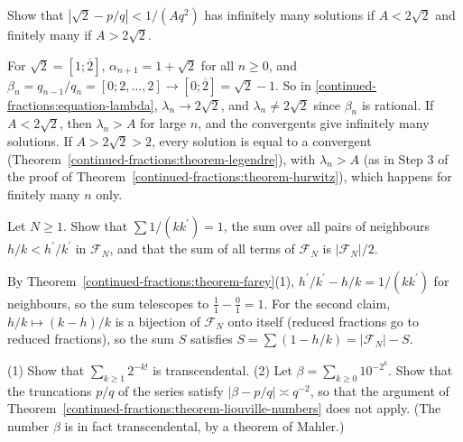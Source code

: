 \begin{exercise}\label{continued-fractions:exercise-sqrt-two-constant}
Show that $|\sqrt2 - p/q| < 1/(Aq^2)$ has infinitely many solutions if $A < 2\sqrt2$ and finitely many if $A > 2\sqrt2$.
\end{exercise}

\begin{solution}
For $\sqrt2 = [1; \overline{2}]$, $\alpha_{n+1} = 1 + \sqrt2$ for all $n \geq 0$, and $\beta_n = q_{n-1}/q_n = [0; 2, \ldots, 2] \to [0; \overline{2}] = \sqrt2 - 1$. So in
\eqref{continued-fractions:equation-lambda}, $\lambda_n \to 2\sqrt2$, and $\lambda_n \neq 2\sqrt2$ since $\beta_n$ is rational. If $A < 2\sqrt2$, then $\lambda_n > A$ for large $n$, and the convergents give
infinitely many solutions. If $A > 2\sqrt2 > 2$, every solution is equal to a convergent (Theorem~\ref{continued-fractions:theorem-legendre}), with $\lambda_n > A$ (as in Step 3 of the proof of
Theorem~\ref{continued-fractions:theorem-hurwitz}), which happens for finitely many $n$ only.
\end{solution}

\begin{exercise}\label{continued-fractions:exercise-farey-sums}
Let $N \geq 1$. Show that $\sum 1/(kk^{\prime}) = 1$, the sum over all pairs of neighbours $h/k < h^{\prime}/k^{\prime}$ in $\mathcal{F}_N$, and that the sum of all terms of $\mathcal{F}_N$ is
$|\mathcal{F}_N|/2$.
\end{exercise}

\begin{solution}
By Theorem~\ref{continued-fractions:theorem-farey}(1), $h^{\prime}/k^{\prime} - h/k = 1/(kk^{\prime})$ for neighbours, so the sum telescopes to $\frac11 - \frac01 = 1$. For the second claim, $h/k \mapsto (k - h)/k$
is a bijection of $\mathcal{F}_N$ onto itself (reduced fractions go to reduced fractions), so the sum $S$ satisfies $S = \sum(1 - h/k) = |\mathcal{F}_N| - S$.
\end{solution}

\begin{exercise}\label{continued-fractions:exercise-liouville}
(1) Show that $\sum_{k \geq 1}2^{-k!}$ is transcendental. (2) Let $\beta = \sum_{k \geq 0}10^{-2^k}$. Show that the truncations $p/q$ of the series satisfy $|\beta - p/q| \asymp q^{-2}$, so that the
argument of Theorem~\ref{continued-fractions:theorem-liouville-numbers} does not apply. (The number $\beta$ is in fact transcendental, by a theorem of Mahler.)
\end{exercise}

